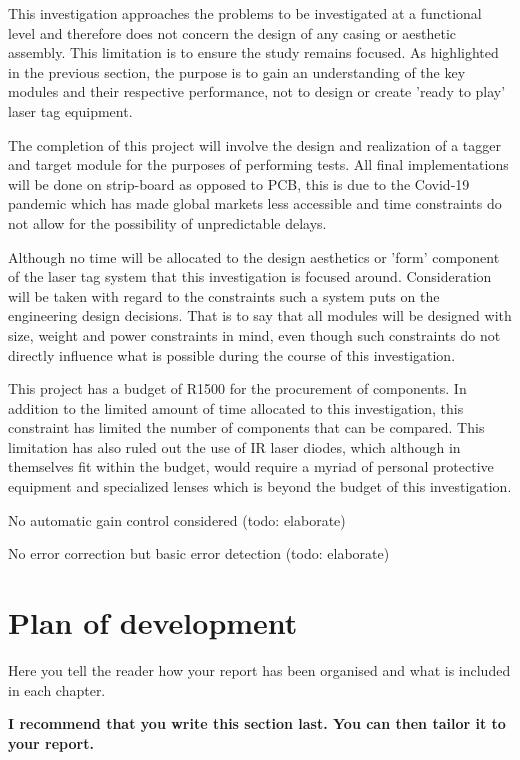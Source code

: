 This investigation approaches the problems to be investigated at a functional level and therefore does not concern the design of any casing or aesthetic assembly. This limitation is to ensure the study remains focused. As highlighted in the previous section, the purpose is to gain an understanding of the key modules and their respective performance, not to design or create 'ready to play' laser tag equipment.

The completion of this project will involve the design and realization of a tagger and target module for the purposes of performing tests. All final implementations will be done on strip-board as opposed to PCB, this is due to the Covid-19 pandemic which has made global markets less accessible and time constraints do not allow for the possibility of unpredictable delays.

Although no time will be allocated to the design aesthetics or 'form' component of the laser tag system that this investigation is focused around. Consideration will be taken with regard to the constraints such a system puts on the engineering design decisions. That is to say that all modules will be designed with size, weight and power constraints in mind, even though such constraints do not directly influence what is possible during the course of this investigation.

This project has a budget of R1500 for the procurement of components. In addition to the limited amount of time allocated to this investigation, this constraint has limited the number of components that can be compared. This limitation has also ruled out the use of IR laser diodes, which although in themselves fit within the budget, would require a myriad of personal protective equipment and specialized lenses which is beyond the budget of this investigation.

No automatic gain control considered (todo: elaborate)

No error correction but basic error detection (todo: elaborate)





\section{Plan of development}
Here you tell the reader how your report has been organised and what is included in each
chapter.

{\bf I recommend that you write this section last. You can then tailor it to your report.}
